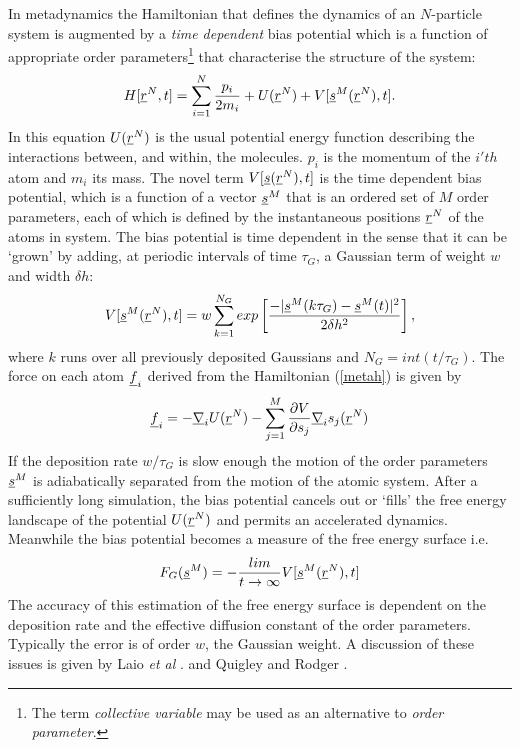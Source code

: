 In metadynamics the Hamiltonian that defines the dynamics of an $N$-particle
system is augmented by a {\em time dependent} bias potential which is a function
of appropriate order parameters\footnote{The term {\em collective variable}
  may be used as an alternative to {\em order parameter}. } that characterise
the structure of the system:
\begin{equation}
H[\mbox{$\underline{r}$}^{N},t]=\sum_{i=1}^{N}\frac{p_{i}}{2m_{i}} + U(\mbox{$\underline{r}$}^{N})+ 
V[\mbox{$\underline{s}$}^{M}(\mbox{$\underline{r}$}^{N}),t].\label{metah}
\end{equation}
In this equation $U(\mbox{$\underline{r}$}^{N})$ is the usual potential energy function
describing the interactions between, and within, the molecules. $p_{i}$ is the
momentum of the $i'th$ atom and $m_{i}$ its mass. The novel term
$V[\mbox{$\underline{s}$}(\mbox{$\underline{r}$}^{N}),t]$ is the time dependent bias potential, which is a
function of a vector $\mbox{$\underline{s}$}^{M}$ that is an ordered set of $M$ order
parameters, each of which is defined by the instantaneous positions
$\mbox{$\underline{r}$}^{N}$ of the atoms in system. The bias potential is time dependent in
the sense that it can be `grown' by adding, at periodic intervals of time
$\tau_{G}$, a Gaussian term of weight $w$ and width $\delta h$:
\begin{equation}
\index{metadynamics!Gaussian potential}
V[\vek{s}^{M}(\vek{r}^{N}),t]=w\sum_{k=1}^{N_{G}}
exp \left [\frac{-|\vek{s}^{M}(k\tau_{G})-\vek{s}^{M}(t)|^{2}}
{2\delta h^{2}} \right ], \label{depgauss}
\end{equation}
where $k$ runs over all previously deposited Gaussians and
$N_{G}=int(t/\tau_{G})$. 
The force on each atom $\mbox{$\underline{f}$}_{i}$ derived from the Hamiltonian
(\ref{metah}) is given by
\begin{equation}
\mbox{$\underline{f}$}_{i}=-\mbox{$\underline{\nabla}$}_{i} U(\mbox{$\underline{r}$}^{N}) - \sum_{j=1}^{M}
\frac{\partial V}{\partial s_{j}}\mbox{$\underline{\nabla}$}_{i} s_{j}(\mbox{$\underline{r}$}^{N})
\end{equation}
If the deposition rate $w/\tau_{G}$ is slow enough the motion of the order
parameters $\mbox{$\underline{s}$}^{M}$ is adiabatically separated from the motion of the
atomic system. After a sufficiently long simulation, the bias potential
cancels out or `fills' the free energy landscape of the potential
$U(\mbox{$\underline{r}$}^{N})$ and permits an accelerated dynamics. Meanwhile the bias
potential becomes a measure of the free energy surface i.e.
\begin{equation}
F_{G}(\mbox{$\underline{s}$}^{M})=-\frac{lim}{t \rightarrow \infty}
V[\mbox{$\underline{s}$}^{M}(\mbox{$\underline{r}$}^{N}),t] \label{metafree}
\end{equation}
The accuracy of this estimation of the free energy surface is dependent on the
deposition rate and the effective diffusion constant of the order
parameters. Typically the error is of order $w$, the Gaussian weight.
A discussion of these issues is given by Laio {\em et al} \cite{laio-05a}.
and Quigley and Rodger \cite{quigley-09a}.

